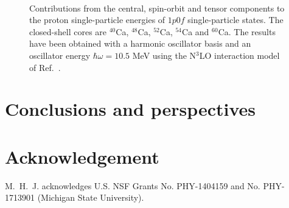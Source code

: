 \documentclass[preprint,12pt,authoryear]{elsarticle}
\begin{document}
\begin{figure}%
     \begin{center}
        \\ %
    \end{center}
\caption{Contributions from the central, spin-orbit and tensor components to  
the proton single-particle energies of $1p0f$ single-particle states. 
The closed-shell cores are $^{40}$Ca, $^{48}$Ca, $^{52}$Ca, 
$^{54}$Ca and $^{60}$Ca. The results have been obtained with a harmonic oscillator basis and an 
oscillator energy $\hbar\omega =10.5$ MeV using the N$^3$LO interaction model of Ref.~\cite{machleidt2011}.}
\label{fig:hoprotonCa}
\end{figure}


\section{Conclusions and perspectives}\label{sec:conclusions}


\section*{Acknowledgement}
M.~H.~J. acknowledges U.S. NSF Grants No. PHY-1404159 and No. PHY-1713901 (Michigan State University).


%
\end{document}
